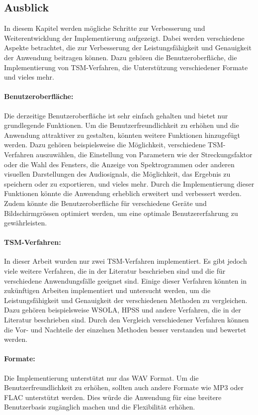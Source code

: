 \subsection{Ausblick}
In  diesem Kapitel werden mögliche Schritte zur Verbesserung und Weiterentwicklung der Implementierung aufgezeigt. Dabei werden verschiedene Aspekte betrachtet, die zur Verbesserung der Leistungsfähigkeit und Genauigkeit der Anwendung beitragen können. Dazu gehören die Benutzeroberfläche, die Implementierung von TSM-Verfahren, die Unterstützung verschiedener Formate und vieles mehr.

\paragraph{Benutzeroberfläche:}
Die derzeitige Benutzeroberfläche ist sehr einfach gehalten und bietet nur grundlegende Funktionen. Um die Benutzerfreundlichkeit zu erhöhen und die Anwendung attraktiver zu gestalten, könnten weitere Funktionen hinzugefügt werden. Dazu gehören beispielsweise die Möglichkeit, verschiedene TSM-Verfahren auszuwählen, die Einstellung von Parametern wie der Streckungsfaktor oder die Wahl des Fensters, die Anzeige von Spektrogrammen oder anderen visuellen Darstellungen des Audiosignals, die Möglichkeit, das Ergebnis zu speichern oder zu exportieren, und vieles mehr. Durch die Implementierung dieser Funktionen könnte die Anwendung erheblich erweitert und verbessert werden. Zudem könnte die Benutzeroberfläche für verschiedene Geräte und Bildschirmgrössen optimiert werden, um eine optimale Benutzererfahrung zu gewährleisten.

\paragraph{TSM-Verfahren:}
In dieser Arbeit wurden nur zwei TSM-Verfahren implementiert. Es gibt jedoch viele weitere Verfahren, die in der Literatur beschrieben sind und die für verschiedene Anwendungsfälle geeignet sind. Einige dieser Verfahren könnten in zukünftigen Arbeiten implementiert und untersucht werden, um die Leistungsfähigkeit und Genauigkeit der verschiedenen Methoden zu vergleichen. Dazu gehören beispielsweise WSOLA, HPSS und andere Verfahren, die in der Literatur beschrieben sind. Durch den Vergleich verschiedener Verfahren können die Vor- und Nachteile der einzelnen Methoden besser verstanden und bewertet werden.

\paragraph{Formate:}
Die Implementierung unterstützt nur das WAV Format. Um die Benutzerfreundlichkeit zu erhöhen, sollten auch andere Formate wie MP3 oder FLAC unterstützt werden. Dies würde die Anwendung für eine breitere Benutzerbasis zugänglich machen und die Flexibilität erhöhen.

